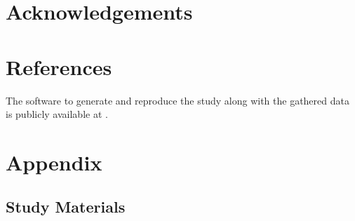 \documentclass[11pt]{article}
\begin{document}
\section{Acknowledgements}


\section{References}

The software to generate and reproduce the study 
along with the gathered data is publicly available at \cite{Nair_Examining_Calibration_Large}.   




\appendix
\section{Appendix}

\subsection{Study Materials}

\label{sec:appendix}
\end{document}
